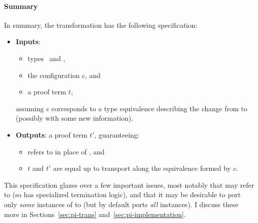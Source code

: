 \paragraph{Summary}

In summary, the transformation has the following specification:

\begin{itemize}
\item \textbf{Inputs}:
\begin{itemize}
\item types \Aa\ and \B,
\item the configuration $c$, and
\item a proof term $t$,
\end{itemize}
assuming $c$ corresponds to a type equivalence describing the change from \Aa to \B (possibly with some new information).
\item \textbf{Outputs}: a proof term $t'$, guaranteeing:
\begin{itemize}
\item {} refers to \B in place of \Aa, and
\item $t$ and $t'$ are equal up to transport along the equivalence formed by $c$.
\end{itemize}
\end{itemize}
This specification glazes over a few important issues, most notably that \B may refer to \Aa (so \toolnamec has specialized termination logic),
and that it may be desirable to port only \textit{some} instances of \Aa to \B (but \toolnamec by default ports \textit{all} instances). 
I discuss these more in Sections~\ref{sec:pi-trans} and~\ref{sec:pi-implementation}.

